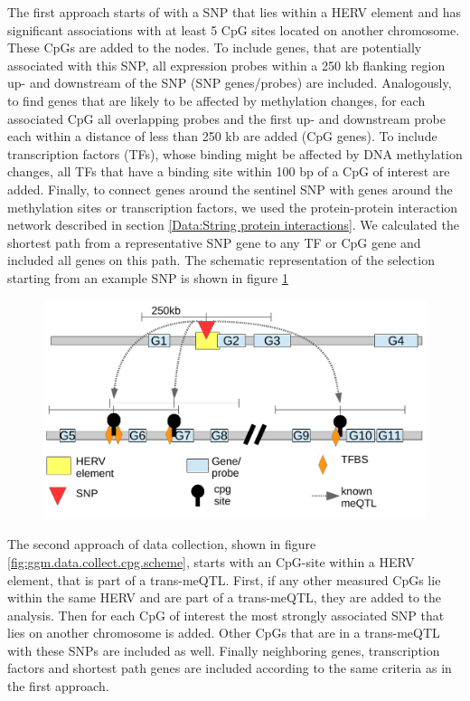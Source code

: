 \documentclass[a4paper,12pt,twoside,openright]{article}
\begin{document}
The first approach starts of with a SNP that lies within a HERV element and has significant associations with at least 5 CpG sites located on another chromosome. These CpGs are added to the nodes. To include genes, that are potentially associated with this SNP, all expression probes within a 250 kb flanking region up- and downstream of the SNP (SNP genes/probes) are included. Analogously, to find genes that are likely to be affected by methylation changes, for each associated CpG all overlapping probes and the first up- and downstream probe each within a distance of less than 250 kb are added (CpG genes). To include transcription factors (TFs), whose binding might be affected by DNA methylation changes, all TFs that have a binding site within 100 bp of a CpG of interest are added. Finally, to connect genes around the sentinel SNP with genes around the methylation sites or transcription factors, we used the protein-protein interaction network described in section \ref{Data:String protein interactions}. We calculated the shortest path from a representative SNP gene to any TF or CpG gene and included all genes on this path. The schematic representation of the selection starting from an example SNP is shown in figure \ref{fig:ggm.data.collect.snp.scheme}

\begin{figure}[b!]
	\includegraphics[scale=0.86, keepaspectratio = true]{../figures/ggm_data_collect_snp_scheme}
	\caption{}
	\label{fig:ggm.data.collect.snp.scheme}
\end{figure}



The second approach of data collection, shown in figure \ref{fig:ggm.data.collect.cpg.scheme}, starts with an CpG-site within a HERV element, that is part of a trans-meQTL. First, if any other measured CpGs lie within the same HERV and are part of a trans-meQTL, they are added to the analysis. Then for each CpG of interest the most strongly associated SNP that lies on another chromosome is added. Other CpGs that are in a trans-meQTL with these SNPs are included as well. Finally neighboring genes, transcription factors and shortest path genes are included according to the same criteria as in the first approach.
\end{document}
